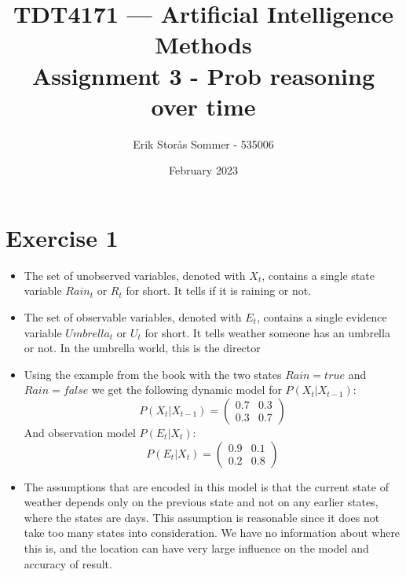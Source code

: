 \documentclass{article}
\title{TDT4171 — Artificial Intelligence Methods \\ Assignment 3 - Prob reasoning over time}
\author{Erik Storås Sommer - 535006}
\date{February 2023}
\begin{document}
\maketitle

\section*{Exercise 1}

\begin{itemize}
  \item The set of unobserved variables, denoted with \(X_t\), contains a single state variable \(Rain_t\) or \(R_t\) for short. It tells if it is raining or not.
  \item The set of observable variables, denoted with \(E_t\), contains a single evidence variable \(Umbrella_t\) or \(U_t\) for short. It tells weather someone has an umbrella or not. In the umbrella world, this is the director
  \item Using the example from the book with the two states \(Rain=true\) and \(Rain=false\) we get the following dynamic model for \(P(X_t|X_{t-1})\):
  \[P(X_t|X_{t-1})= \begin{pmatrix} 0.7 & 0.3 \\ 0.3 & 0.7 \end{pmatrix}\]
  And observation model \(P(E_t|X_t)\):
  \[P(E_t|X_t)= \begin{pmatrix} 0.9 & 0.1 \\ 0.2 & 0.8 \end{pmatrix}\]
  \item The assumptions that are encoded in this model is that the current state of weather depends only on the previous state and not on any earlier states, where the states are days. This assumption is reasonable since it does not take too many states into consideration. We have no information about where this is, and the location can have very large influence on the model and accuracy of result.
\end{itemize}
\end{document}
